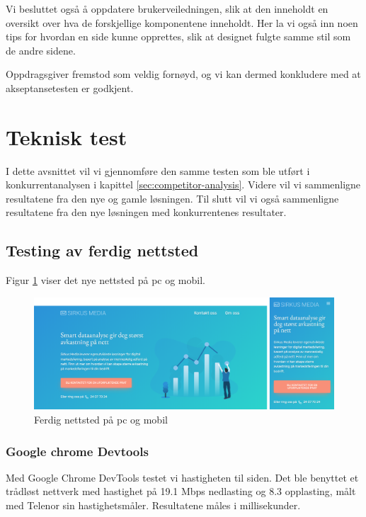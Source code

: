 Vi besluttet også å oppdatere brukerveiledningen, slik at den inneholdt en oversikt over hva de forskjellige komponentene inneholdt. Her la vi også inn noen tips for hvordan en side kunne opprettes, slik at designet fulgte samme stil som de andre sidene.

Oppdragsgiver fremstod som veldig fornøyd, og vi kan dermed konkludere med at akseptansetesten er godkjent.

\section{Teknisk test}
I dette avsnittet vil vi gjennomføre den samme testen som ble utført i konkurrentanalysen i kapittel \ref{sec:competitor-analysis}. Videre vil vi sammenligne resultatene fra den nye og gamle løsningen. Til slutt vil vi også sammenligne resultatene fra den nye løsningen med konkurrentenes resultater.

\subsection{Testing av ferdig nettsted}
Figur \ref{fig:analysis-new-website} viser det nye nettsted på pc og mobil.

\begin{figure}[H]
    \centering
    \includegraphics[width=\textwidth]{bereket/Nettsted-i-pc-og-mobil.png}
    \caption{Ferdig nettsted på pc og mobil}
    \label{fig:analysis-new-website}
\end{figure}

\subsubsection{Google chrome Devtools}
Med Google Chrome DevTools testet vi hastigheten til siden. Det ble benyttet et trådløst nettverk med hastighet på 19.1 Mbps nedlasting og 8.3 opplasting, målt med Telenor sin hastighetsmåler. Resultatene måles i millisekunder.

